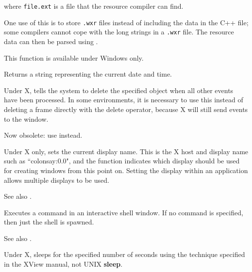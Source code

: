 where {\tt file.ext} is a file that the resource compiler can find.

One use of this is to store {\tt .wxr} files instead of including the data in the C++ file; some compilers
cannot cope with the long strings in a {\tt .wxr} file. The resource data can then be parsed
using .

This function is available under Windows only.

\label{wxnow}


Returns a string representing the current date and time.

\label{wxpostdelete}


Under X, tells the system to delete the specified object when
all other events have been processed. In some environments, it is
necessary to use this instead of deleting a frame directly with the
delete operator, because X will still send events to the window.

Now obsolete: use  instead.

\label{wxsetdisplayname}


Under X only, sets the current display name. This is the X host and display name such
as ``colonsay:0.0", and the function indicates which display should be used for creating
windows from this point on. Setting the display within an application allows multiple
displays to be used.

See also .

\label{wxshell}


Executes a command in an interactive shell window. If no command is
specified, then just the shell is spawned.

See also .



Under X, sleeps for the specified number of seconds using the
technique specified in the XView manual, not UNIX {\bf sleep}.

